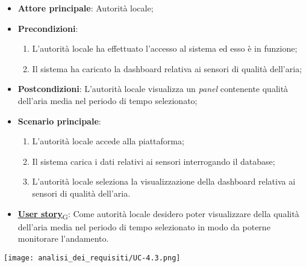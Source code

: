 \begin{itemize}
	\item \textbf{Attore principale}: Autorità locale;
	\item \textbf{Precondizioni}:
	      \begin{enumerate}
		      \item L'autorità locale ha effettuato l'accesso al sistema ed esso è in funzione;
		      \item Il sistema ha caricato la dashboard relativa ai sensori di qualità dell'aria;
	      \end{enumerate}
	\item \textbf{Postcondizioni}: L'autorità locale visualizza un \textit{panel} contenente qualità dell'aria media nel periodo di tempo selezionato;
	\item \textbf{Scenario principale}:
	      \begin{enumerate}
		      \item L'autorità locale accede alla piattaforma;
		      \item Il sistema carica i dati relativi ai sensori interrogando il database;
		      \item L'autorità locale seleziona la visualizzazione della dashboard relativa ai sensori di qualità dell'aria.
	      \end{enumerate}
	\item \href{https://7last.github.io/docs/rtb/documentazione-interna/glossario\#user-story}{\textbf{User story}\textsubscript{G}}: Come autorità locale desidero poter visualizzare della qualità dell'aria media nel periodo di tempo selezionato
	      in modo da poterne monitorare l'andamento.
\end{itemize}
\begin{center}
	\texttt{[image: analisi\_dei\_requisiti/UC-4.3.png]}
\end{center}

